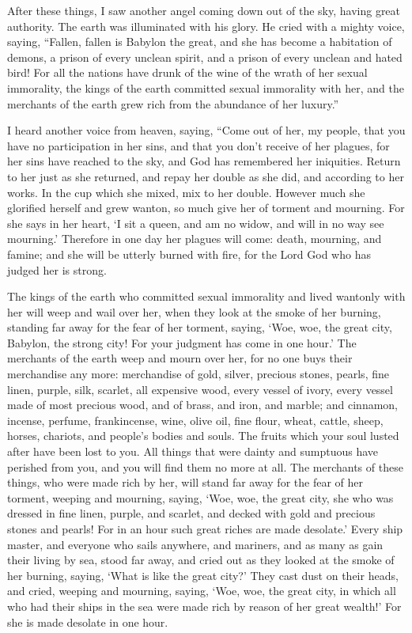 \mychapter{} \myverse*{}After these things, I saw another angel coming down out of the
sky, having great authority. The earth was illuminated with his glory.
\myverse{}He cried with a mighty voice, saying, “Fallen, fallen is Babylon the great,
and she has become a habitation of demons, a prison of every unclean spirit, and a prison of every unclean
and hated bird!
\myverse{}For all the nations have drunk of the wine of the wrath of her sexual immorality,
the kings of the earth committed sexual immorality with her, and the merchants of the earth grew rich
from the abundance of her luxury.”

\myverse{}I heard another voice from heaven, saying, “Come out of her, my
people, that you have no participation in her sins, and that you don’t receive of her plagues,
\myverse{}for her sins have reached to the sky, and God has remembered her iniquities.
\myverse{}Return to her just as she returned, and repay her double as she did, and according
to her works. In the cup which she mixed, mix to her double.
\myverse{}However much she glorified herself and grew wanton, so much give her of torment
and mourning. For she says in her heart, ‘I sit a queen, and am no widow, and will in no way see mourning.’
\myverse{}Therefore in one day her plagues will come: death, mourning, and famine; and
she will be utterly burned with fire, for the Lord God who has judged her is strong.

\myverse{}The kings of the earth who committed sexual immorality and lived
wantonly with her will weep and wail over her, when they look at the smoke of her burning,
\myverse{}standing far away for the fear of her torment, saying, ‘Woe, woe, the great
city, Babylon, the strong city! For your judgment has come in one hour.’
\myverse{}The merchants of the earth weep and mourn over her, for no one buys their
merchandise any more:
\myverse{}merchandise of gold, silver, precious stones, pearls, fine linen, purple,
silk, scarlet, all expensive wood, every vessel of ivory, every vessel made of most precious wood, and
of brass, and iron, and marble;
\myverse{}and cinnamon, incense, perfume, frankincense, wine, olive oil, fine flour,
wheat, cattle, sheep, horses, chariots, and people’s bodies and souls.
\myverse{}The fruits which your soul lusted after have been lost to you. All things
that were dainty and sumptuous have perished from you, and you will find them no more at all.
\myverse{}The merchants of these things, who were made rich by her, will stand far
away for the fear of her torment, weeping and mourning,
\myverse{}saying, ‘Woe, woe, the great city, she who was dressed in fine linen, purple,
and scarlet, and decked with gold and precious stones and pearls!
\myverse{}For in an hour such great riches are made desolate.’ Every ship master, and
everyone who sails anywhere, and mariners, and as many as gain their living by sea, stood far away,
\myverse{}and cried out as they looked at the smoke of her burning, saying, ‘What is
like the great city?’
\myverse{}They cast dust on their heads, and cried, weeping and mourning, saying, ‘Woe,
woe, the great city, in which all who had their ships in the sea were made rich by reason of her great
wealth!’ For she is made desolate in one hour.

